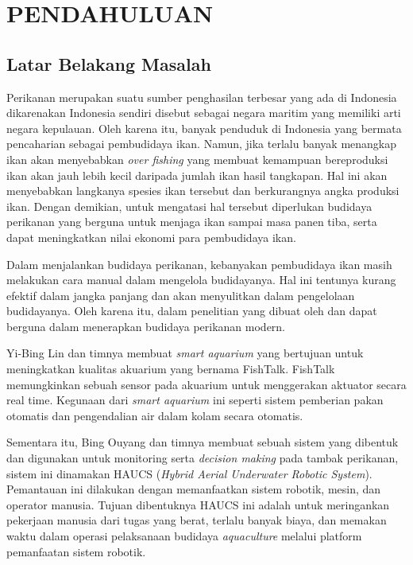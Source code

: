 
\chapter{PENDAHULUAN}

\begin{spacing}{1.5}

\section{Latar Belakang Masalah}

Perikanan merupakan suatu sumber penghasilan terbesar yang ada di Indonesia dikarenakan Indonesia sendiri disebut sebagai negara maritim yang memiliki arti negara kepulauan. Oleh karena itu, banyak penduduk di Indonesia yang bermata pencaharian sebagai pembudidaya ikan. Namun, jika terlalu banyak menangkap ikan akan menyebabkan \textit{over fishing} yang membuat kemampuan bereproduksi ikan akan jauh lebih kecil daripada jumlah ikan hasil tangkapan. Hal ini akan menyebabkan langkanya spesies ikan tersebut dan berkurangnya angka produksi ikan. Dengan demikian, untuk mengatasi hal tersebut diperlukan budidaya perikanan yang berguna untuk menjaga ikan sampai masa panen tiba, serta dapat meningkatkan nilai ekonomi para pembudidaya ikan.

Dalam menjalankan budidaya perikanan, kebanyakan pembudidaya ikan masih melakukan cara manual dalam mengelola budidayanya. Hal ini tentunya kurang efektif dalam jangka panjang dan akan menyulitkan dalam pengelolaan budidayanya. Oleh karena itu, dalam penelitian yang dibuat oleh \citep{fishtalk} dan \citep{haucs} dapat berguna dalam menerapkan budidaya perikanan modern.

Yi-Bing Lin dan timnya membuat \textit{smart aquarium} yang bertujuan untuk meningkatkan kualitas akuarium yang bernama FishTalk. FishTalk memungkinkan sebuah sensor pada akuarium untuk menggerakan aktuator secara real time. Kegunaan dari \textit{smart aquarium} ini seperti sistem pemberian pakan otomatis dan pengendalian air dalam kolam secara otomatis. \citep{fishtalk}

Sementara itu, Bing Ouyang dan timnya membuat sebuah sistem yang dibentuk dan digunakan untuk monitoring serta \textit{decision making} pada tambak perikanan, sistem ini dinamakan HAUCS (\textit{Hybrid Aerial Underwater Robotic System}). Pemantauan ini dilakukan dengan memanfaatkan sistem robotik, mesin, dan operator manusia. Tujuan dibentuknya HAUCS ini adalah untuk meringankan pekerjaan manusia dari tugas yang berat, terlalu banyak biaya, dan memakan waktu dalam operasi pelaksanaan budidaya \textit{aquaculture} melalui platform pemanfaatan sistem robotik. \citep{haucs}


\end{spacing}
